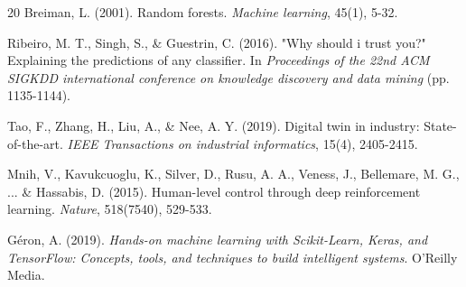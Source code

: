 \documentclass[12pt,a4paper]{report}
\begin{document}
\begin{thebibliography}{20}
Breiman, L. (2001). Random forests. \textit{Machine learning}, 45(1), 5-32.

Ribeiro, M. T., Singh, S., \& Guestrin, C. (2016). "Why should i trust you?" Explaining the predictions of any classifier. In \textit{Proceedings of the 22nd ACM SIGKDD international conference on knowledge discovery and data mining} (pp. 1135-1144).

Tao, F., Zhang, H., Liu, A., \& Nee, A. Y. (2019). Digital twin in industry: State-of-the-art. \textit{IEEE Transactions on industrial informatics}, 15(4), 2405-2415.

Mnih, V., Kavukcuoglu, K., Silver, D., Rusu, A. A., Veness, J., Bellemare, M. G., ... \& Hassabis, D. (2015). Human-level control through deep reinforcement learning. \textit{Nature}, 518(7540), 529-533.

Géron, A. (2019). \textit{Hands-on machine learning with Scikit-Learn, Keras, and TensorFlow: Concepts, tools, and techniques to build intelligent systems}. O'Reilly Media.

\end{thebibliography}
\end{document}
